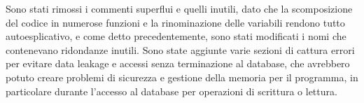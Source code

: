 Sono stati rimossi i commenti superflui e quelli inutili, dato che la scomposizione del codice in numerose
funzioni e la rinominazione delle variabili rendono tutto autoesplicativo, e come detto precedentemente, sono stati modificati i nomi che contenevano ridondanze inutili. 
Sono state aggiunte varie sezioni di cattura errori per evitare data leakage e accessi senza terminazione al database, che avrebbero potuto creare problemi di sicurezza e gestione della memoria per il programma, in particolare durante l'accesso al database per operazioni di scrittura o lettura.